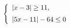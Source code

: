 \begin{ex}[type=ineq_system]
	\begin{condition}
		\( \left\{
		\begin{array}{l}
			|x-3|\ge11,\vspace{2mm}\\
			|5x-11|-64\le0
		\end{array}
		\right. \)
	\end{condition}
\end{ex}
